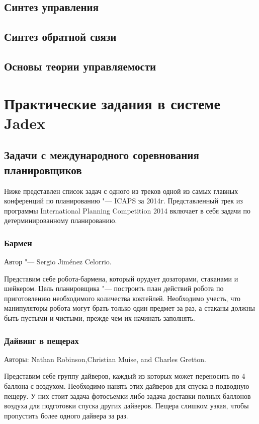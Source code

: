 \documentclass[b5paper,11pt]{book}
\begin{document}
	\section{Синтез управления}
	\section{Синтез обратной связи}
	\section{Основы теории управляемости}
	


	\chapter{Практические задания в системе Jadex}
	\section{Задачи с международного соревнования планировщиков}
	Ниже представлен список задач с одного из треков одной из самых главных конференций по планированию "--- ICAPS за 2014г. Представленный трек из программы International Planning Competition 2014 включает в себя задачи по детерминированному планированию.
	\subsection{Бармен}
	Автор "--- Sergio Jiménez Celorrio.
	
	Представим себе робота-бармена, который орудует дозаторами, стаканами и шейкером. Цель планировщика "--- построить план действий робота по приготовлению необходимого количества коктейлей. Необходимо учесть, что манипуляторы робота могут брать только один предмет за раз, а стаканы должны быть пустыми и чистыми, прежде чем их начинать заполнять.
	\subsection{Дайвинг в пещерах}
	Авторы: Nathan Robinson,Christian Muise, and Charles Gretton.
	
	Представим себе группу дайверов, каждый из которых может переносить по 4 баллона с воздухом. Необходимо нанять этих дайверов для спуска в подводную пещеру. У них стоит задача фотосъемки либо задача доставки полных баллонов воздуха для подготовки спуска других дайверов. Пещера слишком узкая, чтобы пропустить более одного дайвера за раз.
	
\end{document}
